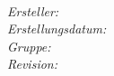\null
\begin{large}
\begin{center}
{ \vspace*{5cm} }
\textbf{\Huge{ \Titel}} \\
\vfill
\begin{minipage}{0.30\textwidth}
  \emph{Ersteller:}\\
  \emph{Erstellungsdatum:}\\
  \emph{Gruppe:}\\
  \emph{Revision:}\\
\end{minipage}
\begin{minipage}{0.40\textwidth}
  \Ersteller\\
  \Erstellungsdatum\\
  \Gruppe\\
  \Revision\\
\end{minipage}
\end{center}
\end{large}
\newpage
